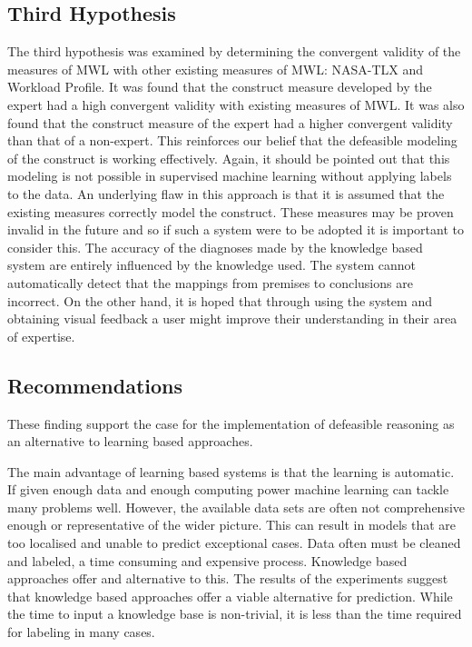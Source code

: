 \subsection{Third Hypothesis}

The third hypothesis was examined by determining the convergent validity of the measures of MWL with other existing measures of MWL: NASA-TLX and Workload Profile. It was found that the construct measure developed by the expert had a high convergent validity with existing measures of MWL. It was also found that the construct measure of the expert had a higher convergent validity than that of a non-expert. This reinforces our belief that the defeasible modeling of the construct is working effectively. Again, it should be pointed out that this modeling is not possible in supervised machine learning without applying labels to the data. An underlying flaw in this approach is that it is assumed that the existing measures correctly model the construct. These measures may be proven invalid in the future and so if such a system were to be adopted it is important to consider this. The accuracy of the diagnoses made by the knowledge based system are entirely influenced by the knowledge used. The system cannot automatically detect that the mappings from premises to conclusions are incorrect. On the other hand, it is hoped that through using the system and obtaining visual feedback a user might improve their understanding in their area of expertise.

\subsection{Recommendations}

These finding support the case for the implementation of defeasible reasoning as an alternative to learning based approaches. 

The main advantage of learning based systems is that the learning is automatic. If given enough data and enough computing power machine learning can tackle many problems well. However, the available data sets are often not comprehensive enough or representative of the wider picture. This can result in models that are too localised and unable to predict exceptional cases. Data often must be cleaned and labeled, a time consuming and expensive process. Knowledge based approaches offer and alternative to this. The results of the experiments suggest that knowledge based approaches offer a viable alternative for prediction. While the time to input a knowledge base is non-trivial, it is less than the time required for labeling in many cases.


